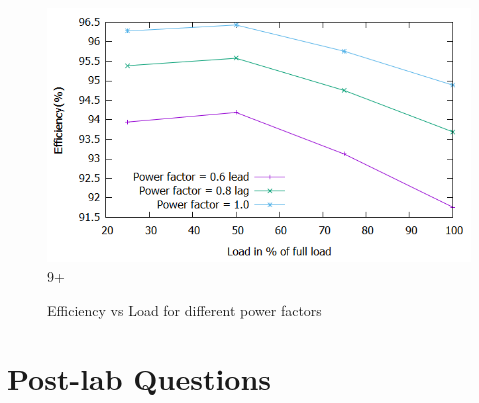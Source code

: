 \documentclass[12pt]{article}
\begin{document}
            \begin{figure}[H]
                \centering
                \includegraphics[width = \linewidth]{LAB-2/Eff_vs_LoVA.png}9+
                \caption{Efficiency vs Load for different power factors}
            \end{figure}
    
        
  \newpage
  
  \section{Post-lab Questions}
  
\end{document}
